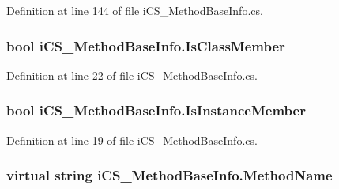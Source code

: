 Definition at line 144 of file i\+C\+S\+\_\+\+Method\+Base\+Info.\+cs.

\hypertarget{classi_c_s___method_base_info_abc811345b9f461b1d8b99d60352d90d7}{
\subsubsection[{Is\+Class\+Member}]{\setlength{\rightskip}{0pt plus 5cm}bool i\+C\+S\+\_\+\+Method\+Base\+Info.\+Is\+Class\+Member\hspace{0.3cm}{\ttfamily [get]}}}\label{classi_c_s___method_base_info_abc811345b9f461b1d8b99d60352d90d7}


Definition at line 22 of file i\+C\+S\+\_\+\+Method\+Base\+Info.\+cs.

\hypertarget{classi_c_s___method_base_info_a63780da65daffae3af039a05cc7592b7}{
\subsubsection[{Is\+Instance\+Member}]{\setlength{\rightskip}{0pt plus 5cm}bool i\+C\+S\+\_\+\+Method\+Base\+Info.\+Is\+Instance\+Member\hspace{0.3cm}{\ttfamily [get]}}}\label{classi_c_s___method_base_info_a63780da65daffae3af039a05cc7592b7}


Definition at line 19 of file i\+C\+S\+\_\+\+Method\+Base\+Info.\+cs.

\hypertarget{classi_c_s___method_base_info_a6c07c29fa728fca926642c5abc4a47a3}{
\subsubsection[{Method\+Name}]{\setlength{\rightskip}{0pt plus 5cm}virtual string i\+C\+S\+\_\+\+Method\+Base\+Info.\+Method\+Name\hspace{0.3cm}{\ttfamily [get]}}}\label{classi_c_s___method_base_info_a6c07c29fa728fca926642c5abc4a47a3}


